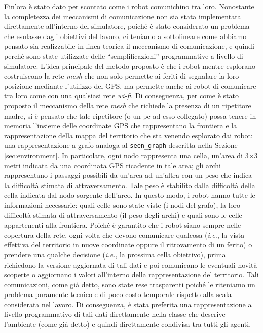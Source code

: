 Fin'ora è stato dato per scontato come i robot comunichino tra loro.
Nonostante la completezza dei meccanismi di comunicazione non sia stata implementata direttamente all'interno del simulatore, poiché è stato considerato un problema che esulasse dagli obiettivi del lavoro, ci teniamo a sottolineare come abbiamo pensato sia realizzabile in linea teorica il meccanismo di comunicazione, e quindi perché sono state utilizzate delle “semplificazioni” programmative a livello di simulatore.
L'idea principale del metodo proposto è che i robot mentre esplorano costruiscono la rete \textit{mesh} che non solo permette ai feriti di segnalare la loro posizione mediante l'utilizzo del GPS, ma permette anche ai robot di comunicare tra loro come con una qualsiasi rete \textit{wi-fi}.
Di conseguenza, per come è stato proposto il meccanismo della rete \textit{mesh}  che richiede la presenza di un ripetitore madre, si è pensato che tale ripetitore (o un pc ad esso collegato) possa tenere in memoria l'insieme delle coordinate GPS che rappresentano la frontiera e la rappresentazione della mappa del territorio che sta venendo esplorato dai robot: una rappresentazione a grafo analoga al \texttt{seen\_graph} descritta nella Sezione \ref{sec:environment}.
In particolare, ogni nodo rappresenta una cella, un'area di 3$\times$3 metri indicata da una coordinata GPS ricadente in tale area; gli archi rappresentano i passaggi possibili da un'area ad un'altra con un peso che indica la difficoltà stimata di attraversamento. Tale peso è stabilito dalla difficoltà della cella indicata dal nodo sorgente dell'arco.
In questo modo, i robot hanno tutte le informazioni necessarie: quali celle sono state viste (i nodi del grafo), la loro difficoltà stimata di attraversamento (il peso degli archi) e quali sono le celle appartenenti alla frontiera.
Poiché è garantito che i robot siano sempre nelle copertura della rete, ogni volta che devono comunicare qualcosa (\textit{i.e.}, la vista effettiva del territorio in nuove coordinate oppure il ritrovamento di un ferito) o prendere una qualche decisione (\textit{i.e.}, la prossima cella obiettivo), prima richiedono la versione aggiornata di tali dati e poi comunicano le eventuali novità scoperte o aggiornano i valori all'interno della rappresentazione del territorio.
Tali comunicazioni, come già detto, sono state rese trasparenti poiché le riteniamo un problema puramente tecnico e di poco costo temporale rispetto alla scala considerata nel lavoro. Di conseguenza, è stata preferita una rappresentazione a livello programmativo di tali dati direttamente nella classe che descrive l'ambiente (come già detto) e quindi direttamente condivisa tra tutti gli agenti.

